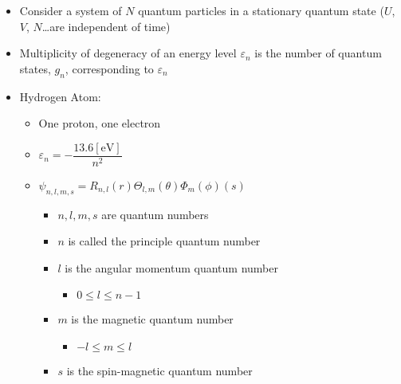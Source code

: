\begin{itemize}

  \item Consider a system of $N$ quantum particles in a stationary quantum state ($U$, $V$, $N$\ldots are independent of time)

  \item Multiplicity of degeneracy of an energy level $\varepsilon_n$ is the number of quantum states, $g_n$, corresponding to $\varepsilon_n$

  \item Hydrogen Atom:

    \begin{itemize}

      \item One proton, one electron

      \item $\varepsilon_n=-\dfrac{13.6[\si{\eV}]}{n^2}$

      \item $\psi_{n,l,m,s}=R_{n,l}(r)\Theta_{l,m}(\theta)\Phi_m(\phi)(s)$

        \begin{itemize}

          \item $n,l,m,s$ are quantum numbers

          \item $n$ is called the principle quantum number

          \item $l$ is the angular momentum quantum number

            \begin{itemize}

              \item $0\leq l\leq n-1$

            \end{itemize}

          \item $m$ is the magnetic quantum number

            \begin{itemize}

              \item $-l\leq m\leq l$

            \end{itemize}

          \item $s$ is the spin-magnetic quantum number

            \begin{itemize}


\end{itemize}
\end{itemize}
\end{itemize}
\end{itemize}
